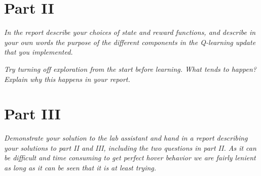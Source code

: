 \section{Part II}
\begin{framed}
  \em In the report describe your choices of state and reward functions, and describe in your own words the purpose of the different components in the Q-learning update that you implemented. \em
\end{framed}

\begin{framed}
  \em Try turning off exploration from the start before learning. What tends to happen? Explain why this happens in your report. \em
\end{framed}


\section{Part III}

\begin{framed} \em
  Demonstrate your solution to the lab assistant and hand in a report describing your solutions to part II and III, including the two questions in part II. As it can be difficult and time consuming to get perfect hover behavior we are fairly lenient as long as it can be seen that it is at least trying.\em
  \end{framed}
